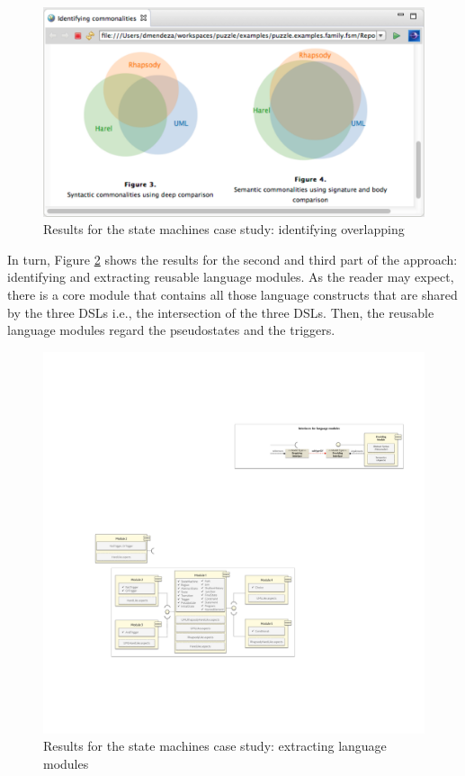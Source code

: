 \begin{figure}
\centering
\includegraphics[width=1\linewidth]{images/puzzle-overlapping.pdf}
\caption{Results for the state machines case study: identifying overlapping}
\label{fig:puzzle-overlapping}
\end{figure}

In turn, Figure \ref{fig:puzzle-modularization} shows the results for the second  and third part of the approach: identifying and extracting reusable language modules. As the reader may expect, there is a core module that contains all those language constructs that are shared by the three DSLs i.e., the intersection of the three DSLs. Then, the reusable language modules regard the pseudostates and the triggers.

\begin{figure}
\centering
\includegraphics[width=1\linewidth]{images/puzzle-modularization.pdf}
\caption{Results for the state machines case study: extracting language modules}
\label{fig:puzzle-modularization}
\end{figure}


